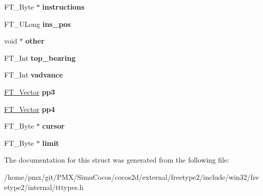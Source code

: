 \begin{DoxyCompactItemize}
F\+T\+\_\+\+Byte $\ast$ {\bfseries instructions}
\item 
\mbox{\label{structTT__LoaderRec___a56c391d36a6391e8395cd09bc972b8b0}} 
F\+T\+\_\+\+U\+Long {\bfseries ins\+\_\+pos}
\item 
\mbox{\label{structTT__LoaderRec___a39647585e0416c3354ed65e3a56a3c1f}} 
void $\ast$ {\bfseries other}
\item 
\mbox{\label{structTT__LoaderRec___a00c9197ba5abd4e677f116423793a9f4}} 
F\+T\+\_\+\+Int {\bfseries top\+\_\+bearing}
\item 
\mbox{\label{structTT__LoaderRec___aec9d10cfbe0ced3fff990bb9e936e95d}} 
F\+T\+\_\+\+Int {\bfseries vadvance}
\item 
\mbox{\label{structTT__LoaderRec___a262052584bfb1ec7e6e801f71169093b}} 
\hyperlink{structFT__Vector__}{F\+T\+\_\+\+Vector} {\bfseries pp3}
\item 
\mbox{\label{structTT__LoaderRec___a0608203207c3fc735046b8baef4b9201}} 
\hyperlink{structFT__Vector__}{F\+T\+\_\+\+Vector} {\bfseries pp4}
\item 
\mbox{\label{structTT__LoaderRec___a68b8157dfe84153d30b4ef64da18bb95}} 
F\+T\+\_\+\+Byte $\ast$ {\bfseries cursor}
\item 
\mbox{\label{structTT__LoaderRec___a28b0a690c2363a61ab34da264606e506}} 
F\+T\+\_\+\+Byte $\ast$ {\bfseries limit}
\end{DoxyCompactItemize}


The documentation for this struct was generated from the following file\+:\begin{DoxyCompactItemize}
\item 
/home/pmx/git/\+P\+M\+X/\+Simu\+Cocos/cocos2d/external/freetype2/include/win32/freetype2/internal/tttypes.\+h\end{DoxyCompactItemize}
